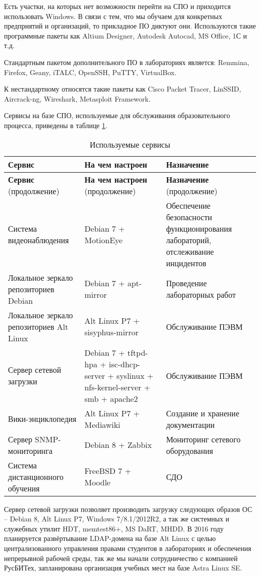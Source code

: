 \documentclass[10pt, a5paper]{article}
\begin{document}
Есть участки, на которых нет возможности перейти на СПО и приходится использовать Windows. В связи с тем, что мы обучаем для конкретных предприятий и организаций, то прикладное ПО диктуют они. Используются такие программные пакеты как Altium Designer, Autodesk Autocad, MS Office, 1С и т.д.

Стандартным пакетом дополнительного ПО в лабораториях является: Remmina, Firefox, Geany, iTALC, OpenSSH, PuTTY, \linebreak VirtualBox.

К нестандартному относятся такие пакеты как Cisco Packet Tracer, LinSSID, Aircrack-ng, Wireshark, Metasploit Framework.

Сервисы на базе СПО, используемые для обслуживания образовательного процесса, приведены в таблице \ref{Uymin2}.
{\small
\begin{longtable}[h!]{|p{3cm}|p{3cm}|p{3cm}|}
\caption{Используемые сервисы} \label{Uymin2} \\
\hline

\textbf{Сервис} & \textbf{На чем настроен} & \textbf{Назначение} \\
\hline
\endfirsthead %

\hline
\textbf{Сервис} (продолжение) & \textbf{На чем настроен} (продолжение) & \textbf{Назначение} (продолжение) \\
\hline
\endhead %

    Система видеонаблюдения &  Debian 7 + MotionEye & Обеспечение безопасности функционирования лабораторий, отслеживание инцидентов \\
\hline
    Локальное зеркало репозиториев Debian & Debian 7 + apt-mirror & Проведение лабораторных работ \\
\hline
    Локальное зеркало репозиториев Alt Linux & Alt Linux P7 + sisyphus-mirror & Обслуживание ПЭВМ \\
\hline
    Сервер сетевой загрузки & Debian 7 + tftpd-hpa + isc-dhcp-server + syslinux + nfs-kernel-server + smb + apache2 & Обслуживание ПЭВМ \\
\hline
    Вики-энциклопедия & Alt Linux P7 + Mediawiki & Создание и хранение документации \\
\hline
    Сервер SNMP-мониторинга & Debian 8 + Zabbix & Мониторинг сетевого оборудования \\
\hline
    Система дистанционного обучения & FreeBSD 7 + Moodle & СДО \\
\hline

\end{longtable}
}
Сервер сетевой загрузки позволяет производить загрузку следующих образов ОС – Debian 8, Alt Linux P7, Windows 7/8.1/2012R2, а так же системных и служебных утилит HDT, memtest86+, MS DaRT, MHDD. 
В 2016 году планируется развёртывание \linebreak LDAP-домена на базе Alt Linux с целью централизованного управления правами студентов в лабораториях и обеспечения непрерывной рабочей среды, так же мы начали сотрудничество с компанией РусБИТех, запланирована организация учебных мест на базе Astra Linux SE.
\end{document}

